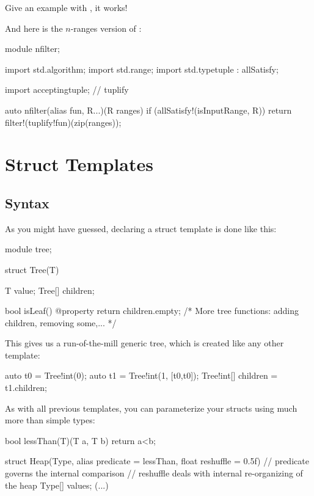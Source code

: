 Give an example with , it works!

And here is the $n$-ranges version of :

\begin{dcode}
module nfilter;

import std.algorithm;
import std.range;
import std.typetuple : allSatisfy;

import acceptingtuple; // tuplify

auto nfilter(alias fun, R...)(R ranges) if (allSatisfy!(isInputRange, R))
{
    return filter!(tuplify!fun)(zip(ranges));
}
\end{dcode}

\section{Struct Templates}\label{structtemplates}
\subsection{Syntax}\label{structsyntax}

As you might have guessed, declaring a struct template is done like this:

\begin{dcode}
module tree;

struct Tree(T)
{
    T value;
    Tree[] children;

    bool isLeaf() @property { return children.empty;}
    /* More tree functions: adding children, removing some,... */
}     
\end{dcode}


This gives us a run-of-the-mill generic tree, which is created like any other template:

\begin{dcode}
auto t0 = Tree!int(0);
auto t1 = Tree!int(1, [t0,t0]);
Tree!int[] children = t1.children;
\end{dcode}

As with all previous templates, you can parameterize your structs using much more than simple types:

\begin{dcode}
bool lessThan(T)(T a, T b) { return a<b;}

struct Heap(Type, alias predicate = lessThan, float reshuffle = 0.5f)
{
    // predicate governs the internal comparison
    // reshuffle deals with internal re-organizing of the heap
    Type[] values;
(...)
}
\end{dcode}

